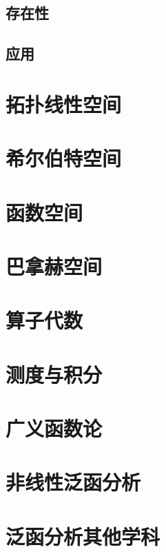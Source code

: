 \documentclass[UTF8]{../09-Mathematics}
\begin{document}
 


\subsection{存在性}
\subsection{应用}


\section{拓扑线性空间}
\section{希尔伯特空间}
\section{函数空间}
\section{巴拿赫空间}
\section{算子代数}
\section{测度与积分}
\section{广义函数论}
\section{非线性泛函分析}
\section{泛函分析其他学科}
\end{document}
